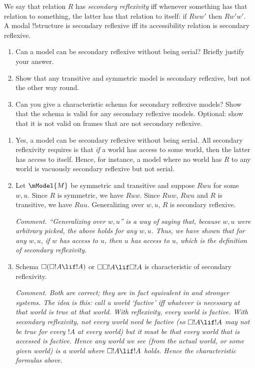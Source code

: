 \documentclass[../../../include/open-logic-section]{subfiles}
\begin{document}
\begin{prob}
    We say that relation $R$ has \emph{secondary reflexivity} iff 
    whenever something has that relation to something, the latter has
    that relation to itself: if $Rww'$ then $Rw'w'$. A modal !!{structure}
    is secondary reflexive iff its accessibility relation is secondary 
    reflexive.

    \begin{enumerate}
    \item Can a model can be secondary reflexive without 
    being serial? Briefly justify your answer.
    \item Show that any transitive and symmetric model is secondary 
    reflexive, but not the other way round.
    \item Can you give a characteristic schema for secondary reflexive
    models? Show that the schema is valid for any secondary reflexive
    models. Optional: show that it is not valid on frames that are not
    secondary reflexive.
    \end{enumerate}

    \begin{ans}
    \begin{enumerate}
    \item Yes, a model can be secondary reflexive without 
    being serial. All secondary reflexivity requires is that 
    \emph{if} a world has access to some world, then the latter
    has access to itself. Hence, for instance, a model where 
    no world has $R$ to any world is vacuously secondary 
    reflexive but not serial. 

    \item Let $\mModel{M}$ be symmetric and transitive and 
    suppose $Rwu$ for some $w,u$. Since $R$ is symmetric, 
    we have $Ruw$. Since $Ruw$, $Rwu$ and $R$ is transitive,
    we have $Ruu$. Generalizing over $w,u$, $R$ is 
    secondary reflexive.

    \emph{Comment. ``Generalizing over $w,u$'' is a way of 
    saying that, because $w,u$ were arbitrary picked, the 
    above holds for any $w,u$. Thus, we have shown that 
    for any $w,u$, if $w$ has access to $u$, then $u$ 
    has access to $u$, which is the definition of 
    secondary reflexivity.}

    \item Schema $\Box(\Box!A\lif!A)$ or $\Box\Box!A\lif \Box!A$
    is characteristic of secondary reflexivity. 
    
    \emph{Comment. Both are correct; they are in fact equivalent 
    in  and stronger systems. The idea is this: call a world 
    `factive' iff whatever is necessary at that world is true at that 
    world. With reflexivity, every world is factive. With secondary
    reflexivity, not every world need be factive (so $\Box!A\lif!A$ may not
    be true for every $!A$ at every world) but it must be that 
    every world \emph{that is accessed} is factive. Hence any world 
    we see (from the actual world, or some given world) is a world
    where $\Box!A\lif!A$ holds. Hence the characteristic formulas above.}
    

\end{enumerate}
\end{ans}
\end{prob}
\end{document}
